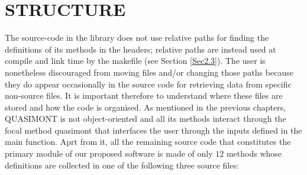 \documentclass[a4paper, twosided]{book}
\begin{document}
\newpage
{}
\vspace{0.6cm}

\section[Structure]{\changefont STRUCTURE}\label{Sec2.2}

\noindent
The source-code in the library does not use relative paths for finding the definitions of its methods in the headers; relative paths are instead used at compile and link time by the \colorbox{poliGrayBlue}{makefile} (see Section \ref{Sec2.3}). The user is nonetheless discouraged from moving files and/or changing those paths because they do appear occasionally in the source code for retrieving data from specific non-source files. 
\newline
\noindent 
It is important therefore to understand where these files are stored and how the code is organised. As mentioned in the previous chapters, QUASIMONT is not object-oriented and all its methods interact through the focal method \colorbox{poliGrayBlue}{quasimont} that interfaces the user through the inputs defined in the \colorbox{poliGrayBlue}{main} function. Aprt from it, all the remaining source code that constitutes the primary module of our proposed software is made of only $12$ methods whose definitions are collected in one of the following three source files:
\end{document}
